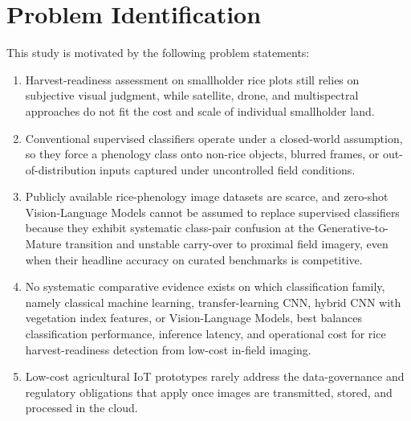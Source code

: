\section{Problem Identification}
This study is motivated by the following problem statements:
\begin{enumerate}
    \item Harvest-readiness assessment on smallholder rice plots still relies on subjective visual judgment, while satellite, drone, and multispectral approaches do not fit the cost and scale of individual smallholder land.

    \item Conventional supervised classifiers operate under a closed-world assumption, so they force a phenology class onto non-rice objects, blurred frames, or out-of-distribution inputs captured under uncontrolled field conditions.

    \item Publicly available rice-phenology image datasets are scarce, and zero-shot Vision-Language Models cannot be assumed to replace supervised classifiers because they exhibit systematic class-pair confusion at the Generative-to-Mature transition and unstable carry-over to proximal field imagery, even when their headline accuracy on curated benchmarks is competitive.

    \item No systematic comparative evidence exists on which classification family, namely classical machine learning, transfer-learning CNN, hybrid CNN with vegetation index features, or Vision-Language Models, best balances classification performance, inference latency, and operational cost for rice harvest-readiness detection from low-cost in-field imaging.

    \item Low-cost agricultural IoT prototypes rarely address the data-governance and regulatory obligations that apply once images are transmitted, stored, and processed in the cloud.
\end{enumerate}


